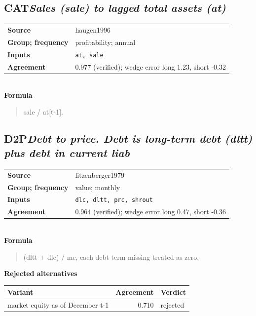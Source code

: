 \documentclass[11pt]{article}
\begin{document}
\subsection*{CAT\quad\normalfont\itshape Sales (sale) to lagged total assets (at)}
\begin{tabular}{@{}p{3.3cm}p{12.3cm}@{}}
\textbf{Source} & haugen1996\\
\textbf{Group; frequency} & profitability; annual\\
\textbf{Inputs} & \texttt{at, sale}\\
\textbf{Agreement} & 0.977 (verified); wedge error long 1.23, short -0.32\\
\end{tabular}\\[4pt]
\textbf{Formula}
\begin{quote}\small
sale / at[t-1].\\

\end{quote}
\subsection*{D2P\quad\normalfont\itshape Debt to price. Debt is long-term debt (dltt) plus debt in current liab}
\begin{tabular}{@{}p{3.3cm}p{12.3cm}@{}}
\textbf{Source} & litzenberger1979\\
\textbf{Group; frequency} & value; monthly\\
\textbf{Inputs} & \texttt{dlc, dltt, prc, shrout}\\
\textbf{Agreement} & 0.964 (verified); wedge error long 0.47, short -0.36\\
\end{tabular}\\[4pt]
\textbf{Formula}
\begin{quote}\small
(dltt + dlc) / me, each debt term missing treated as zero.\\

\end{quote}
\textbf{Rejected alternatives}\\[2pt]
{\small\begin{longtable}{@{}p{9.6cm}rp{4.3cm}@{}}
\toprule Variant & Agreement & Verdict\\\midrule\endhead
market equity as of December t-1 & 0.710 & rejected\\
\bottomrule\end{longtable}}
\end{document}
